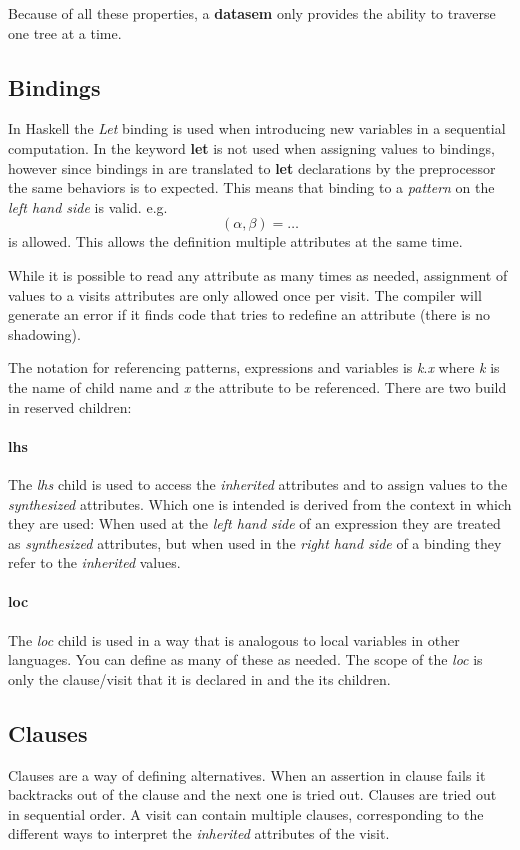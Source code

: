 Because of all these properties, a \textbf{datasem} only provides the ability to traverse one tree at a time.
\subsection{Bindings}
\label{bindings}
In Haskell the \emph{Let} binding is used when introducing new variables in a sequential computation. In \rcore the keyword \textbf{let} is not used when assigning values to bindings, however since bindings in \rcore are translated to \textbf{let} declarations by the preprocessor the same behaviors is to expected. This means that binding to a \emph{pattern} on the \emph{left hand side} is valid. e.g. \[ (\alpha, \beta) = \ldots \] is allowed. This allows the definition multiple attributes at the same time.

While it is possible to read any attribute as many times as needed, assignment of values to a visits attributes are only allowed once per visit. The compiler will generate an error if it finds code that tries to redefine an attribute (there is no shadowing).

The notation for referencing patterns, expressions and variables is \emph{k}.\emph{x} where \emph{k} is the name of child name and \emph{x} the attribute to be referenced. There are two build in reserved children:

\paragraph{lhs}
The \emph{lhs} child is used to access the \emph{inherited} attributes and to assign values to the \emph{synthesized} attributes. Which one is intended is derived from the context in which they are used: When used at the \emph{left hand side} of an expression they are treated as \emph{synthesized} attributes, but when used in the \emph{right hand side} of a binding they refer to the \emph{inherited} values.
 
\paragraph{loc}
The \emph{loc} child is used in a way that is analogous to local variables in other languages. You can define as many of these as needed. The scope of the \emph{loc} is only the clause/visit that it is declared in and the its children.

\subsection{Clauses}
Clauses are a way of defining alternatives. When an assertion in clause fails  it backtracks out of the clause and the next one is tried out. Clauses are tried out in sequential order. A visit can contain multiple clauses, corresponding to the different ways to interpret the \emph{inherited} attributes of the visit.

